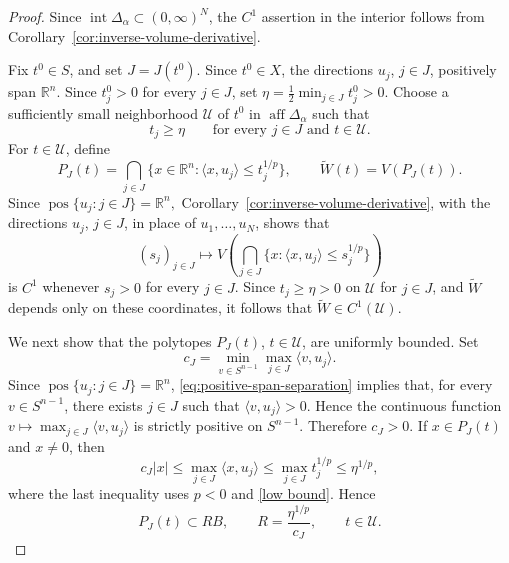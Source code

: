 \documentclass[12pt,reqno]{amsart}
\numberwithin{equation}{section}
\theoremstyle{remark}
\DeclareMathOperator{\pos}{pos}
\newcommand{\R}{\mathbb R}
\begin{document}
\begin{proof}
	Since
	\(\operatorname{int}\Delta_\alpha\subset(0,\infty)^N\), the
	\(C^1\) assertion in the interior follows from
	Corollary~\ref{cor:inverse-volume-derivative}.
	
	Fix \(t^0\in S\), and set \(J=J(t^0)\). Since \(t^0\in X\), the
	directions \(u_j\), \(j\in J\), positively span \(\R^n\). 
	Since \(t_j^0>0\) for every \(j\in J\), set
	\(
	\eta=\frac12\min_{j\in J}t_j^0>0.
	\)
	Choose a sufficiently small neighborhood \(\mathcal U\) of \(t^0\)
	in \(\operatorname{aff}\Delta_\alpha\) such that
	\begin{equation}\label{low bound}
	t_j\geq\eta
	\qquad
	\text{for every }j\in J\text{ and }t\in\mathcal U.
	\end{equation}
	For \(t\in\mathcal U\), define
	\[
	P_J(t)
	=
	\bigcap_{j\in J}
	\{x\in\R^n:\langle x,u_j\rangle\leq t_j^{1/p}\},
	\qquad
	\widetilde W(t)=V(P_J(t)).
	\]
	Since
	\(
	\pos\{u_j:j\in J\}=\R^n,
	\)
	Corollary~\ref{cor:inverse-volume-derivative}, with the directions
	\(u_j\), \(j\in J\), in place of \(u_1,\ldots,u_N\), shows that
	\[
	(s_j)_{j\in J}
	\longmapsto
	V\left(
	\bigcap_{j\in J}
	\{x:\langle x,u_j\rangle\leq s_j^{1/p}\}
	\right)
	\]
	is \(C^1\) whenever \(s_j>0\) for every \(j\in J\).
	Since \(t_j\geq\eta>0\) on \(\mathcal U\) for \(j\in J\), and
	\(\widetilde W\) depends only on these coordinates, it follows that
	\(\widetilde W\in C^1(\mathcal U)\).
	
	
	
We next show that the polytopes \(P_J(t)\), \(t\in\mathcal U\),
are uniformly bounded. Set
	\[
	c_J
	=
	\min_{v\in S^{n-1}}
	\max_{j\in J}\langle v,u_j\rangle.
	\]
	Since
	\(\pos\{u_j:j\in J\}=\R^n\), 
	\eqref{eq:positive-span-separation} implies that, for every
	\(v\in S^{n-1}\), there exists \(j\in J\) such that
	\(\langle v,u_j\rangle>0\). Hence the continuous function
	\(
	v\longmapsto \max_{j\in J}\langle v,u_j\rangle
	\)
	is strictly positive on  \(S^{n-1}\). Therefore
	\(
	c_J
	>0
	\).
	 If
	\(x\in P_J(t)\) and \(x\neq0\), then
	\[
	c_J|x|
	\leq
	\max_{j\in J}\langle x,u_j\rangle
	\leq
	\max_{j\in J}t_j^{1/p}
	\leq
	\eta^{1/p},
	\]
	where the last inequality uses \(p<0\) and \eqref{low bound}. Hence
	\[
	P_J(t)\subset RB,
	\qquad
	R=\frac{\eta^{1/p}}{c_J},
	\qquad
	t\in\mathcal U.
	\]
	

\end{proof}
\end{document}
